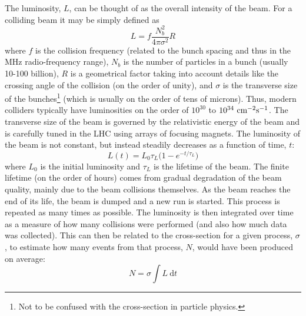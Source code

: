The luminosity, $L$,  can be thought of as the overall intensity of the beam.
For a colliding beam it may be simply defined as
\begin{equation}
L=f \frac{N_b^2}{4\pi\sigma^2} R
\end{equation}
where $f$ is the collision frequency (related to the bunch spacing and thus
in the MHz radio-frequency range), 
$N_b$ is the number of particles in a bunch (usually 10-100 billion), 
$R$ is a  geometrical factor
taking into account details like the crossing angle of the collision (on the
order of unity),
and $\sigma$ is the transverse size of the bunches\footnote{Not to be confused
with the cross-section in particle physics.} (which 
is usually on the order of tens of microns).
Thus, modern colliders typically have luminosities on the order of 
$10^{30}$ to $10^{34}~\textrm{cm}^{-2}\textrm{s}^{-1}$.
The transverse size of the beam is governed by the relativistic 
energy of the beam and is carefully tuned in the LHC
using arrays of focusing magnets. 
The luminosity of the beam is not constant, but instead steadily decreases
as a function of time, $t$:
\begin{equation}
L(t) = L_0 \tau_L\Big( 1- e^{-t/\tau_L} \Big)
\label{eq:lhc_lumi}
\end{equation}
where $L_0$ is the initial luminosity and $\tau_L$ is the lifetime of the 
beam. The finite lifetime (on the order of hours) comes from gradual 
degradation of the beam quality, mainly due to the beam collisions themselves.
As the beam reaches the end of its life, the beam is dumped and a new
run is started. This process is repeated as many times as possible. The 
luminosity is then integrated over time as a measure of how many collisions
were performed (and also how much data was collected).  This can
then be related to the cross-section for a given process, $\sigma$, to estimate
how many events from that process, $N$, would have been produced on average:
\begin{equation}
N=\sigma \int L~ \textrm{d}t
\end{equation}


